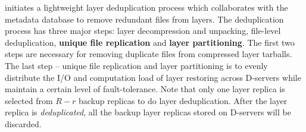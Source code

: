  \sysname initiates a lightweight layer deduplication process which collaborates with the metadata database
 to remove redundant files from layers. 
The deduplication process has three major steps: 
layer decompression and unpacking, 
file-level deduplication,
\textbf{unique file replication} and \textbf{layer partitioning}. 
The first two steps are necessary for removing duplicate files from compressed layer tarballs.
The last step -- unique file replication and layer partitioning is 
to evenly distribute the I/O and computation load of layer restoring across D-servers 
while maintain a certain level of fault-tolerance.  
Note that only one layer replica is selected from $R-r$ backup replicas to do layer deduplication.
After the layer replica is \emph{deduplicated}, all the backup layer replicas stored on D-servers will be discarded.  


%
